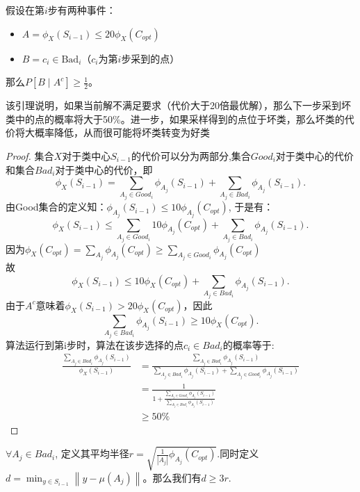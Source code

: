 \documentclass[lang=cn,newtx,10pt,scheme=chinese,chinesefont=nofont,citestyle=gb7714-2015, bibstyle=gb7714-2015]{elegantbook}
\begin{document}
\begin{refsection}
\begin{lemma}
假设在第$i$步有两种事件：
\begin{itemize}
\item $A = {\phi_X(S_{i-1}) \leq 20\phi_X(C_{opt})}$
\item $B = {c_i \in \text{Bad}_i}$（$c_i$为第$i$步采到的点）
\end{itemize}
那么$P[B \mid A^c] \geq \frac{1}{2}$。
\end{lemma}
该引理说明，如果当前解不满足要求（代价大于20倍最优解），那么下一步采到坏类中的点的概率将大于50\%。进一步，如果采样得到的点位于坏类，那么坏类的代价将大概率降低，从而很可能将坏类转变为好类
\begin{proof}
集合$\mathit X$对于类中心$\mathit S_{\mathit i-1}$的代价可以分为两部分,集合$\mathit Good_{i}$对于类中心的代价和集合$\mathit Bad_{i}$对于类中心的代价，即
\[
    \phi_X(S_{i-1}) = \sum_{A_j \in Good_i} \phi_{A_j}(S_{i-1}) + \sum_{A_j \in Bad_i} \phi_{A_j}(S_{i-1}).
    \]
由Good集合的定义知：\( \phi_{A_j}(S_{i-1}) \leq 10 \phi_{A_j}(C_{opt}) \),
于是有：
\[
    \phi_X(S_{i-1}) \leq \sum_{A_j \in Good_i} 10 \phi_{A_j}(C_{opt}) + \sum_{A_j \in Bad_i} \phi_{A_j}(S_{i-1}).
    \]
因为\( \phi_X(C_{opt}) = \sum_{A_j} \phi_{A_j}(C_{opt}) \geq \sum_{A_j \in Good_i} \phi_{A_j}(C_{opt})\)\\
故\[
    \phi_X(S_{i-1}) \leq 10 \phi_X(C_{opt}) + \sum_{A_j \in Bad_i} \phi_{A_j}(S_{i-1}).
    \]
由于$A^c$意味着\( \phi_X(S_{i-1}) > 20 \phi_X(C_{opt}) \)，因此
 \[
    \sum_{A_j \in Bad_i} \phi_{A_j}(S_{i-1}) \geq  10 \phi_X(C_{opt}).
    \]
算法运行到第i步时，算法在该步选择的点$\mathit c_{\mathit i}\in\mathit Bad_{i}$的概率等于:
\begin{align*}
\frac{\sum_{A_j \in Bad_i} \phi_{A_j}(S_{i-1})}{\phi_X(S_{i-1})} 
&= \frac{\sum_{A_j \in Bad_i} \phi_{A_j}(S_{i-1})}{\sum_{A_j \in Bad_i} \phi_{A_j}(S_{i-1}) + \sum_{A_j \in Good_i} \phi_{A_j}(S_{i-1})} \\
&= \frac{1}{1 + \frac{\sum_{A_j \in Good_i} \phi_{A_j}(S_{i-1})}{\sum_{A_j \in Bad_i} \phi_{A_j}(S_{i-1})}} \\
&\geq 50\%
\end{align*}
\end{proof}

\begin{lemma}
    $\forall A_j\in Bad_i$, 定义其平均半径$r=\sqrt{\frac{1}{|A_j|}\phi_{A_j}(C_{opt})}$.同时定义$d=\mathop{\min}_{y\in S_{i-1}}\left\lVert y-\mu(A_j) \right\rVert$。那么我们有$d\geq 3r$.
\end{lemma}


\end{refsection}
\end{document}
